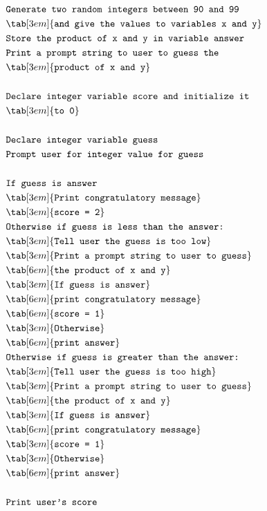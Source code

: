 \begin{align*}
&\texttt{Generate two random integers between 90 and 99}\\
&\tab[3em]{\texttt{and give the values to variables x and y}}\\
&\texttt{Store the product of x and y in variable answer}\\
&\texttt{Print a prompt string to user to guess the}\\
&\tab[3em]{\texttt{product of x and y}}\\\\
&\texttt{Declare integer variable score and initialize it}\\
&\tab[3em]{\texttt{to 0}}\\\\
&\texttt{Declare integer variable guess}\\
&\texttt{Prompt user for integer value for guess}\\\\
&\texttt{If guess is answer}\\
&\tab[3em]{\texttt{Print congratulatory message}}\\
&\tab[3em]{\texttt{score = 2}}\\
&\texttt{Otherwise if guess is less than the answer:}\\
&\tab[3em]{\texttt{Tell user the guess is too low}}\\
&\tab[3em]{\texttt{Print a prompt string to user to guess}}\\
&\tab[6em]{\texttt{the product of x and y}}\\
&\tab[3em]{\texttt{If guess is answer}}\\
&\tab[6em]{\texttt{print congratulatory message}}\\
&\tab[6em]{\texttt{score = 1}}\\
&\tab[3em]{\texttt{Otherwise}}\\
&\tab[6em]{\texttt{print answer}}\\
&\texttt{Otherwise if guess is greater than the answer:}\\
&\tab[3em]{\texttt{Tell user the guess is too high}}\\
&\tab[3em]{\texttt{Print a prompt string to user to guess}}\\
&\tab[6em]{\texttt{the product of x and y}}\\
&\tab[3em]{\texttt{If guess is answer}}\\
&\tab[6em]{\texttt{print congratulatory message}}\\
&\tab[3em]{\texttt{score = 1}}\\
&\tab[3em]{\texttt{Otherwise}}\\
&\tab[6em]{\texttt{print answer}}\\\\
&\texttt{Print user's score}\\
\end{align*}


